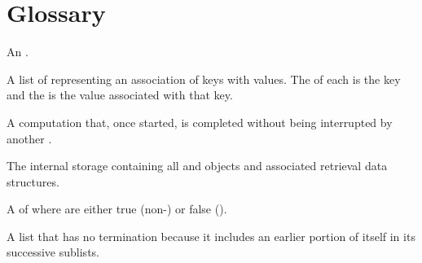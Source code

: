 \documentclass[10pt,twoside,english,pdftex]{article}
\begin{document}

\T\markright{}%
\T\pagestyle{plain}
\T\cleardoublepage
\T{}%
\T\markright{}%
\W{}
\T\pagestyle{fancy}
\T\thispagestyle{fancybottom}
\T{}%
\T\global\def\fnlastname{ }%
\T\renewcommand{\headrulewidth}{0pt}
\section*{Glossary}

\begin{glossary-list}
  
  
\glent[alist]
An .


%
A list of  representing an association of keys with values. The
 of each  is the key and the  is the value
associated with that key.


%
A computation that, once started, is completed without being interrupted by
another .


%
The internal storage containing all  and
 objects and associated retrieval data structures.


%
%
%
A  of   where
  are either true (non-\nil) or
false (\nil).


%
A list that has no termination because it includes an earlier portion of
itself in its successive sublists.


\end{glossary-list}
\end{document}
